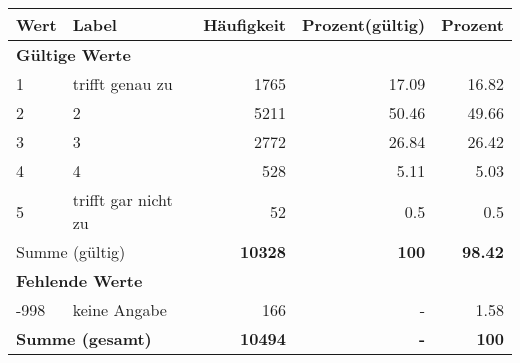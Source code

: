      \begin{longtable}{lXrrr}
     \toprule
     \textbf{Wert} & \textbf{Label} & \textbf{Häufigkeit} & \textbf{Prozent(gültig)} & \textbf{Prozent} \\
     \endhead
     \midrule
     \multicolumn{5}{l}{\textbf{Gültige Werte}}\\

     1 &
     \multicolumn{1}{X}{ trifft genau zu   } &


       \num{1765} &
       \num[round-mode=places,round-precision=2]{17.09} &
         \num[round-mode=places,round-precision=2]{16.82} \\

     2 &
     \multicolumn{1}{X}{ 2   } &


       \num{5211} &
       \num[round-mode=places,round-precision=2]{50.46} &
         \num[round-mode=places,round-precision=2]{49.66} \\

     3 &
     \multicolumn{1}{X}{ 3   } &


       \num{2772} &
       \num[round-mode=places,round-precision=2]{26.84} &
         \num[round-mode=places,round-precision=2]{26.42} \\

     4 &
     \multicolumn{1}{X}{ 4   } &


       \num{528} &
       \num[round-mode=places,round-precision=2]{5.11} &
         \num[round-mode=places,round-precision=2]{5.03} \\

     5 &
     \multicolumn{1}{X}{ trifft gar nicht zu   } &


       \num{52} &
       \num[round-mode=places,round-precision=2]{0.5} &
         \num[round-mode=places,round-precision=2]{0.5} \\
     \midrule
     \multicolumn{2}{l}{Summe (gültig)} &
       \textbf{\num{10328}} &
     \textbf{\num{100}} &
       \textbf{\num[round-mode=places,round-precision=2]{98.42}} \\
     \multicolumn{5}{l}{\textbf{Fehlende Werte}}\\
       -998 &
       keine Angabe &
         \num{166} &
        - &
         \num[round-mode=places,round-precision=2]{1.58} \\
     \midrule
     \multicolumn{2}{l}{\textbf{Summe (gesamt)}} &
          \textbf{\num{10494}} &
        \textbf{-} &
        \textbf{\num{100}} \\
     \bottomrule
     \end{longtable}
     

